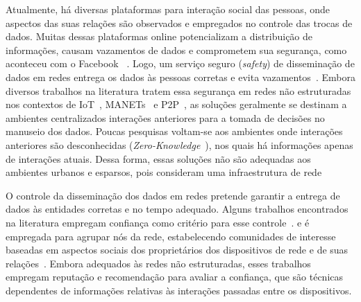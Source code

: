 Atualmente, há  diversas plataformas para interação social das pessoas, onde aspectos das suas relações são observados e empregados no controle das trocas de dados. Muitas dessas plataformas online potencializam a distribuição de informações, causam vazamentos de dados e comprometem sua segurança, como aconteceu com o Facebook ~\cite{FacebookLeakage}. Logo, um serviço seguro (\textit{safety}) de disseminação de dados em redes entrega os dados às pessoas corretas e evita vazamentos~\cite{lima2009survey}. Embora diversos trabalhos na literatura tratem essa segurança em redes não estruturadas nos contextos de IoT~\cite{al2017trust,bao2013scalable}, MANETs~\cite{mannes2012quorum} e P2P~\cite{vasilomanolakis2017trust},  as soluções geralmente se destinam a ambientes centralizados  interações anteriores para a tomada de decisões no manuseio dos dados. Poucas pesquisas voltam-se aos ambientes onde interações anteriores são desconhecidas (\textit{Zero-Knowledge}~\cite{feige1988zero}), nos quais há informações apenas de interações atuais. Dessa forma, essas soluções não são adequadas aos ambientes urbanos   e esparsos, pois consideram  uma infraestrutura de rede %

O controle da disseminação dos dados em redes pretende garantir a entrega de dados às entidades corretas e no tempo adequado. Alguns trabalhos encontrados na literatura empregam confiança como critério para esse controle~\cite{al2017trust}.  e é empregada para agrupar nós da rede, estabelecendo comunidades de interesse baseadas em aspectos sociais dos proprietários dos dispositivos de rede e de suas relações~\cite{bao2013scalable}. Embora adequados às redes não estruturadas, esses trabalhos empregam reputação e recomendação para avaliar a confiança, que são técnicas dependentes de informações relativas às interações passadas entre os dispositivos. 